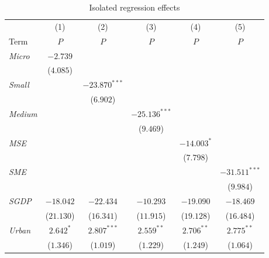 \documentclass [12pt]{article}
\begin{document}
\newpage
\begin{table}[htbp]
    \centering
    \smaller
    \caption{Isolated regression effects}
    \begin{threeparttable}
        \begin{tabular}{lccccc}
            \toprule
            \toprule
            & (1) & (2) & (3) & (4) & (5) \\
            Term & \(P\) & \(P\) & \(P\) & \(P\) & \(P\) \\
            \midrule
                           
            \textit{Micro} & $-2.739$ & $ $ & $ $ & $ $ & $ $ \\
                           & ($4.085$) & $ $ & $ $ & $ $ & $ $ \\
                           
            \textit{Small} & $ $ & $-23.870^{***}$ & $ $ & $ $ & $ $ \\
                           & $ $ & ($6.902$) & $ $ & $ $ & $ $ \\
                           
            \textit{Medium} & $ $ & $ $ & $-25.136^{***}$  & $ $ & $ $ \\
                            & $ $ & $ $ & ($9.469$)  & $ $ & $ $ \\
                            
            \textit{MSE} & $ $ & $ $ & $ $ & $-14.003^{*}$ & $ $ \\
                         & $ $ & $ $ & $ $ & ($7.798$) & $ $ \\
                         
            \textit{SME} & $ $ & $ $ & $ $ & $ $ & $-31.511^{***}$ \\
                         & $ $ & $ $ & $ $ & $ $ & ($9.984$) \\
                                  
            \textit{SGDP} & $-18.042$ & $-22.434$  & $-10.293$ & $-19.090$  & $-18.469$ \\
                          & ($21.130$) & ($16.341$) & ($ 11.915$)  & ($19.128$)  & ($16.484$) \\
                          
            \textit{Urban} & $2.642^{*}$ & $2.807^{***}$  & $ 2.559^{**}$ & $ 2.706^{**}$  & $ 2.775^{**}$ \\
                           & ($1.346$)  & ($1.019$)  & ($1.229$)  & ($1.249$)  & ($1.064$)  \\
                           

\end{tabular}
\end{threeparttable}
\end{table}
\end{document}
